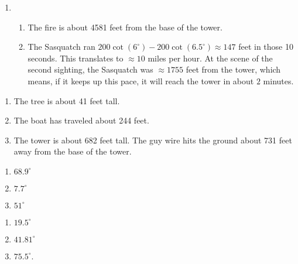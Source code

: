 \documentclass{ximera}
\begin{document}
\begin{enumerate}

\setcounter{enumi}{\value{HW}}

\item \begin{enumerate}

\addtocounter{enumii}{1}

\item The fire is about 4581 feet from the base of the tower.

\item  The Sasquatch ran $200\cot(6^{\circ}) - 200\cot(6.5^{\circ}) \approx 147$ feet in those 10 seconds. This translates to $\approx 10$ miles per hour.  At the scene of the second sighting, the Sasquatch was $\approx 1755$ feet from the tower, which means, if it keeps up this pace, it will reach the tower in about $2$ minutes.

\end{enumerate}

\setcounter{HW}{\value{enumi}}

\end{enumerate}

\begin{enumerate}

\setcounter{enumi}{\value{HW}}

\item  The tree is about 41 feet tall.

\item The boat has traveled about 244 feet.

\item  The tower is about 682 feet tall. The guy wire hits the ground about  731 feet away from the base of the tower.

\setcounter{HW}{\value{enumi}}

\end{enumerate}

\begin{multicols}{3}

\begin{enumerate}

\setcounter{enumi}{\value{HW}}

\item $68.9^{\circ}$

\item $7.7^{\circ}$

\item $51^{\circ}$

\setcounter{HW}{\value{enumi}}

\end{enumerate}

\end{multicols}

\begin{multicols}{3}

\begin{enumerate}

\setcounter{enumi}{\value{HW}}

\item $19.5^{\circ}$

\item  $41.81^{\circ}$

\item  $75.5^{\circ}$.

\setcounter{HW}{\value{enumi}}

\end{enumerate}

\end{multicols}
\end{document}

